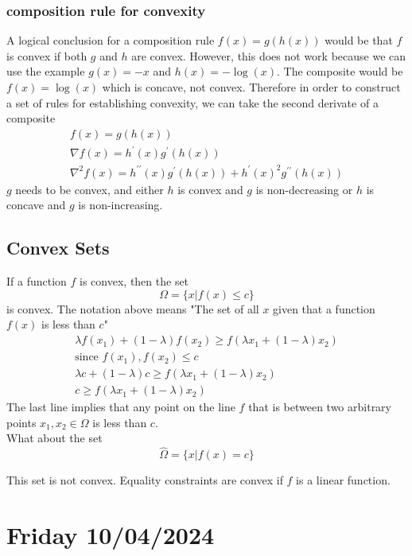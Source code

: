 \subsubsection{composition rule for convexity}
A logical conclusion for a composition rule $f(x) = g(h(x))$ would be that $f$ is convex if both $g$ and $h$ are convex. However, this does not work because we can use the example $g(x) = -x$ and $h(x) = -\log(x)$. The composite would be $f(x) = \log(x)$ which is concave, not convex. Therefore in order to construct a set of rules for establishing convexity, we can take the second derivate of a composite
\begin{gather}
  f(x) = g(h(x)) \\ 
  \nabla f(x) = h^\prime(x) g^\prime(h(x)) \\
  \nabla^2 f(x) = h^{\prime \prime}(x) g^\prime(h(x)) + h^\prime(x)^2 g^{\prime \prime}(h(x))
\end{gather}
$g$ needs to be convex, and either $h$ is convex and $g$ is non-decreasing or $h$ is concave and $g$ is non-increasing.

\subsection{Convex Sets}
If a function $f$ is convex, then the set
\begin{equation}
  \Omega = \{ x | f(x) \leq c \}
\end{equation}
is convex. The notation above means "The set of all $x$ given that a function $f(x)$ is less than $c$"
\begin{gather}
  \lambda f(x_1) + (1-\lambda) f(x_2) \geq f(\lambda x_1 + (1-\lambda)x_2) \\
  \text{since } f(x_1), f(x_2) \leq c \\
  \lambda c + (1-\lambda) c \geq f(\lambda x_1 + (1-\lambda)x_2) \\ 
  c \geq f(\lambda x_1 + (1-\lambda)x_2)
\end{gather}
The last line implies that any point on the line $f$ that is between two arbitrary points $x_1,x_2 \in \Omega$ is less than $c$. \\
What about the set 
\begin{equation}
  \hat{\Omega} = \{x | f(x) = c\} 
\end{equation}

This set is not convex. Equality constraints are convex if $f$ is a linear function.

\section{Friday 10/04/2024}
